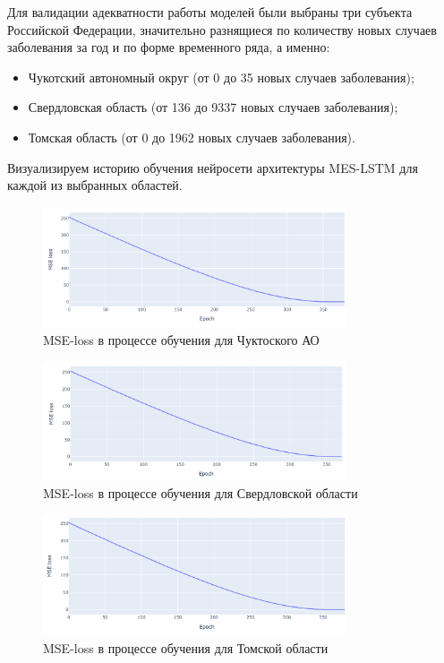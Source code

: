 Для валидации адекватности работы моделей были выбраны три субъекта Российской Федерации, значительно разнящиеся по количеству новых случаев заболевания за год и по форме временного ряда, а именно: 

\begin{itemize}
	\item Чукотский автономный округ (от 0 до 35 новых случаев заболевания);
	\item Свердловская область  (от 136 до 9337 новых случаев заболевания); 
	\item Томская область (от 0 до 1962 новых случаев заболевания).
\end{itemize}

Визуализируем историю обучения нейросети архитектуры MES-LSTM для каждой из выбранных областей.

\begin{figure}[ht!]
	\centering
	\includegraphics[width=0.8\textwidth]{images/chukotka_train_loss.png}
	\caption{MSE-loss в процессе обучения для Чуктоского АО}
	\label{fig:chukotka_train_score}
\end{figure}

\begin{figure}[h!]
	\centering
	\includegraphics[width=0.8\textwidth]{images/sverdlovsk_train_loss}
	\caption{MSE-loss в процессе обучения для Свердловской области}
	\label{fig:sverdlovk_train_score}
\end{figure}

\begin{figure}[h!]
	\centering
	\includegraphics[width=0.8\textwidth]{images/tomsk_train_loss.png}
	\caption{MSE-loss в процессе обучения для Томской области}
	\label{fig:tomsk_train_score}
\end{figure}

